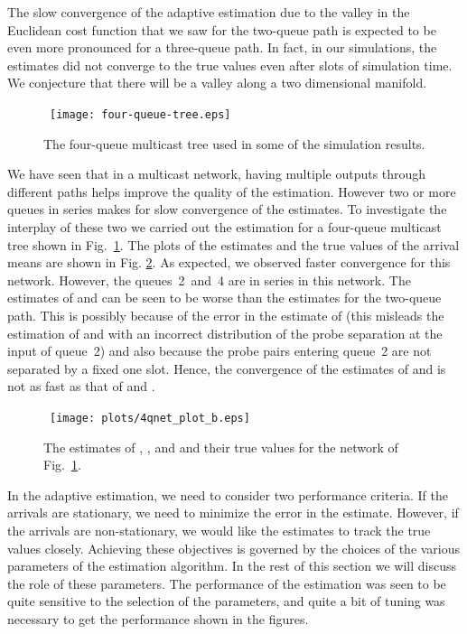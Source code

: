 \documentclass[11pt]{article}
\begin{document}
The slow convergence of the adaptive estimation due to the valley in
the Euclidean cost function that we saw for the two-queue path is
expected to be even more pronounced for a three-queue path. In fact,
in our simulations, the estimates did not converge to the true values
even after  slots of simulation time.  We conjecture
that there will be a valley along a two dimensional manifold.

\begin{figure}
  \begin{center}
    \ 
    \texttt{[image: four-queue-tree.eps]}
  \end{center}
  \caption{The four-queue multicast tree used in some of the
    simulation results. }
  \label{fig:four-queue-tree}
\end{figure}


We have seen that in a multicast network, having multiple outputs
through different paths helps improve the quality of the estimation.
However two or more queues in series makes for slow convergence of the
estimates. To investigate the interplay of these two we carried out
the estimation for a four-queue multicast tree shown in
Fig.~\ref{fig:four-queue-tree}.  The plots of the estimates and the
true values of the arrival means are shown in Fig.  \ref{fig_4qnet}.
As expected, we observed faster convergence for this network. However,
the queues~2~and~4 are in series in this network. The estimates of
 and  can be seen to be worse than the estimates
for the two-queue path.  This is possibly because of the error in the
estimate of  (this misleads the estimation of 
and  with an incorrect distribution of the probe separation
at the input of queue~2) and also because the probe pairs entering
queue~2 are not separated by a fixed one slot. Hence, the convergence
of the estimates of  and  is not as fast as that
of  and .
\begin{figure}
  \begin{center}
    \
    \texttt{[image: plots/4qnet\_plot\_b.eps]}
  \end{center}
  \caption{The estimates of , ,  and
     and their true values for the network of
    Fig.~\ref{fig:four-queue-tree}.}
  \label{fig_4qnet}
\end{figure}

In the adaptive estimation, we need to consider two performance
criteria. If the arrivals are stationary, we need to minimize the
error in the estimate. However, if the arrivals are non-stationary, we
would like the estimates to track the true values closely. Achieving
these objectives is governed by the choices of the various parameters
of the estimation algorithm.  In the rest of this section we will
discuss the role of these parameters. The performance of the estimation
was seen to be quite sensitive to the selection of the parameters,
and quite a bit of tuning was necessary to get the performance
shown in the figures.
\end{document}
